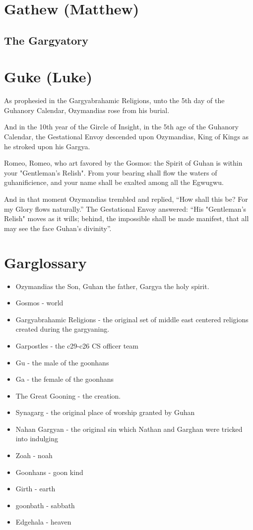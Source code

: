 \documentclass{article}
\begin{document}
\section{Gathew (Matthew)}

\subsection{The Gargyatory}

\section{Guke (Luke)}

As prophesied in the Gargyabrahamic Religions, unto the 5th day of the Guhanory Calendar, Ozymandias rose from his burial. 

And in the 10th year of the Gircle of Insight, in the 5th age of the Guhanory Calendar, the Gestational Envoy descended upon Ozymandias, King of Kings as he stroked upon his Gargya. 

Romeo, Romeo, who art favored by the Gosmos: the Spirit of Guhan is within your "Gentleman’s Relish". From your bearing shall flow the waters of guhanificience, and your name shall be exalted among all the Egwugwu.

And in that moment Ozymandias trembled and replied, “How shall this be? For my Glory flows naturally.” The Gestational Envoy answered: “His "Gentleman’s Relish" moves as it wills; behind, the impossible shall be made manifest, that all may see the face Guhan’s divinity”.

\section{Garglossary}

\begin{itemize}
  \item Ozymandias the Son, Guhan the father, Gargya the holy spirit.
  \item Gosmos - world
  \item Gargyabrahamic Religions - the original set of middle east centered religions created during the gargyaning.
  \item Garpostles - the c29-c26 CS officer team
  \item Gu - the male of the goonhans
  \item Ga - the female of the goonhans
  \item The Great Gooning - the creation.
  \item Synagarg - the original place of worship granted by Guhan
  \item Nahan Gargyan - the original sin which Nathan and Garghan were tricked into indulging
  \item Zoah - noah
  \item Goonhans - goon kind
  \item Girth - earth
  \item goonbath - sabbath
  \item Edgehala - heaven
\end{itemize}
\end{document}
